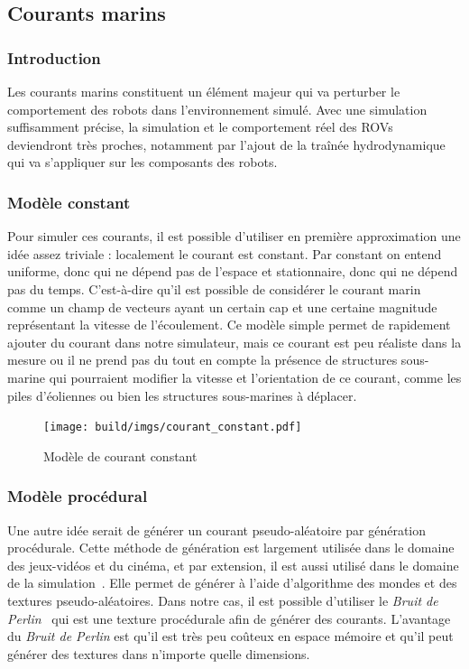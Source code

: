 		\subsection{Courants marins}

			\subsubsection{Introduction}

				Les courants marins constituent un élément majeur qui va perturber le comportement des robots dans l'environnement simulé. Avec une simulation suffisamment précise, la simulation et le comportement réel des \gls{ROV}s deviendront très proches, notamment par l'ajout de la traînée hydrodynamique qui va s'appliquer sur les composants des robots.

			\subsubsection{Modèle constant}

				Pour simuler ces courants, il est possible d'utiliser en première approximation une idée assez triviale : localement le courant est constant. Par constant on entend uniforme, donc qui ne dépend pas de l'espace et stationnaire, donc qui ne dépend pas du temps. C’est-à-dire qu'il est possible de considérer le courant marin  comme un champ de vecteurs ayant un certain cap et une certaine magnitude représentant la vitesse de l'écoulement. Ce modèle simple permet de rapidement ajouter du courant dans notre simulateur, mais ce courant est peu réaliste dans la mesure ou il ne prend pas du tout en compte la présence de structures sous-marine qui pourraient modifier la vitesse et l'orientation de ce courant, comme les piles d'éoliennes ou bien les structures sous-marines à déplacer.

				\begin{figure}[!htb]
					\centering
					\texttt{[image: build/imgs/courant\_constant.pdf]}
					\caption{Modèle de courant constant}
					\label{fig:constant}
				\end{figure}

			\subsubsection{Modèle procédural}

				Une autre idée serait de générer un courant pseudo-aléatoire par génération procédurale. Cette méthode de génération est largement utilisée dans le domaine des jeux-vidéos et du cinéma, et par extension, il est aussi utilisé dans le domaine de la simulation~\cite{generation_procedurale_monde, volumetric_terrain_generation}. Elle permet de générer à l'aide d'algorithme des mondes et des textures pseudo-aléatoires. Dans notre cas, il est possible d'utiliser le \textit{Bruit de Perlin}~\cite{PerlinNoise} qui est une texture procédurale afin de générer des courants. L'avantage du \textit{Bruit de Perlin} est qu'il est très peu coûteux en espace mémoire et qu'il peut générer des textures dans n'importe quelle dimensions. 
				
